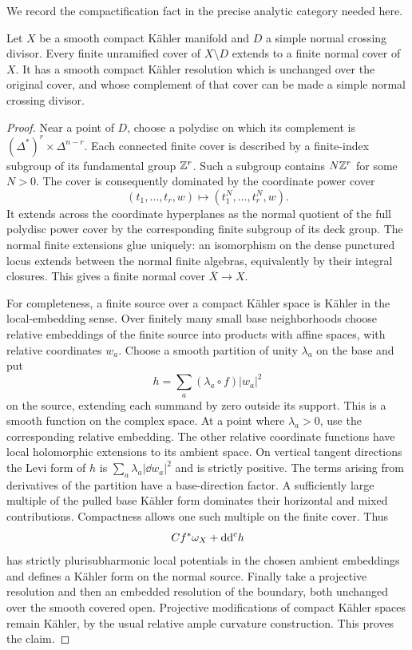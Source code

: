 We record the compactification fact in the precise analytic category
needed here.

\begin{lemma}\label{fol:cover-compactification}
Let $X$ be a smooth compact K\"ahler manifold and $D$ a simple normal
crossing divisor.  Every finite unramified cover of $X\setminus D$
extends to a finite normal cover of $X$.  It has a smooth compact
K\"ahler resolution which is unchanged over the original cover, and
whose complement of that cover can be made a simple normal crossing
divisor.
\end{lemma}

\begin{proof}
Near a point of $D$, choose a polydisc on which its complement is
$(\Delta^*)^r\times\Delta^{n-r}$.  Each connected finite cover is
described by a finite-index subgroup of its fundamental group
$\mathbb{Z}^r$.  Such a subgroup contains $N\mathbb{Z}^r$ for some $N>0$.
The cover is consequently dominated by the coordinate power cover
\[
 (t_1,\ldots,t_r,w)\longmapsto(t_1^N,\ldots,t_r^N,w).
\]
It extends across the coordinate hyperplanes as the normal quotient
of the full polydisc power cover by the corresponding finite subgroup
of its deck group.  The normal finite extensions glue uniquely:
an isomorphism on the dense punctured locus extends between the
normal finite algebras, equivalently by their integral closures.
This gives a finite normal cover $\overline X\to X$.

For completeness, a finite source over a compact K\"ahler space is
K\"ahler in the local-embedding sense.  Over finitely many small base
neighborhoods choose relative embeddings of the finite source into
products with affine spaces, with relative coordinates $w_a$.
Choose a smooth partition of unity $\lambda_a$ on the base and put
\[
 h=\sum_a(\lambda_a\circ f)|w_a|^2
\]
on the source, extending each summand by zero outside its support.
This is a smooth function on the complex space.  At a point where
$\lambda_a>0$, use the corresponding relative embedding.
The other relative coordinate functions have local holomorphic
extensions to its ambient space.  On vertical tangent directions the
Levi form of $h$ is
$\sum_a\lambda_a|\dd w_a|^2$ and is strictly positive.  The terms
arising from derivatives of the partition have a base-direction
factor.  A sufficiently large multiple of the pulled base K\"ahler
form dominates their horizontal and mixed contributions.  Compactness
allows one such multiple on the finite cover.  Thus
\[
 C f^*\omega_X+\mathrm{d}\mathrm{d}^{c} h
\]
has strictly plurisubharmonic local potentials in the chosen ambient
embeddings and defines a K\"ahler form on the normal source.
Finally take a projective resolution and then an embedded resolution
of the boundary, both unchanged over the smooth covered open.
Projective modifications of compact K\"ahler spaces remain K\"ahler,
by the usual relative ample curvature construction.  This proves the
claim.
\end{proof}

